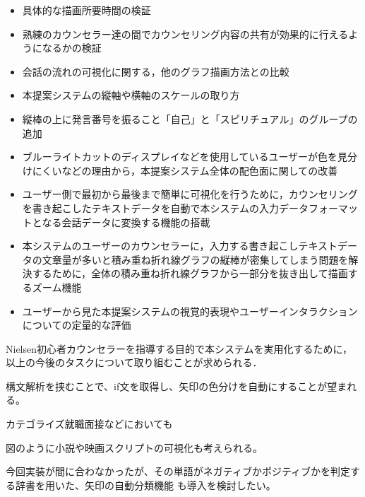 \documentclass[shuuron]{kuee}
\begin{document}
\begin{itemize}
\item 具体的な描画所要時間の検証
\item 熟練のカウンセラー達の間でカウンセリング内容の共有が効果的に行えるようになるかの検証
\item 会話の流れの可視化に関する，他のグラフ描画方法との比較
\item 本提案システムの縦軸や横軸のスケールの取り方
\item 縦棒の上に発言番号を振ること「自己」と「スピリチュアル」のグループの追加
\item ブルーライトカットのディスプレイなどを使用しているユーザーが色を見分けにくいなどの理由から，本提案システム全体の配色面に関しての改善
\item ユーザー側で最初から最後まで簡単に可視化を行うために，カウンセリングを書き起こしたテキストデータを自動で本システムの入力データフォーマットとなる会話データに変換する機能の搭載
\item 本システムのユーザーのカウンセラーに，入力する書き起こしテキストデータの文章量が多いと積み重ね折れ線グラフの縦棒が密集してしまう問題を解決するために，全体の積み重ね折れ線グラフから一部分を抜き出して描画するズーム機能
\item ユーザーから見た本提案システムの視覚的表現やユーザーインタラクションについての定量的な評価
\end{itemize}

Nielsen初心者カウンセラーを指導する目的で本システムを実用化するために，以上の今後のタスクについて取り組むことが求められる．%


構文解析を挟むことで、if文を取得し、矢印の色分けを自動にすることが望まれる。

カテゴライズ就職面接などにおいても

図のように小説や映画スクリプトの可視化も考えられる。

今回実装が間に合わなかったが、その単語がネガティブかポジティブかを判定する辞書を用いた、矢印の自動分類機能\cite{小林のぞみ2005意見抽出のための評価表現の収集} \cite{東山昌彦2008述語の選択選好性に着目した名詞評価極性の獲得} も導入を検討したい。
\end{document}
